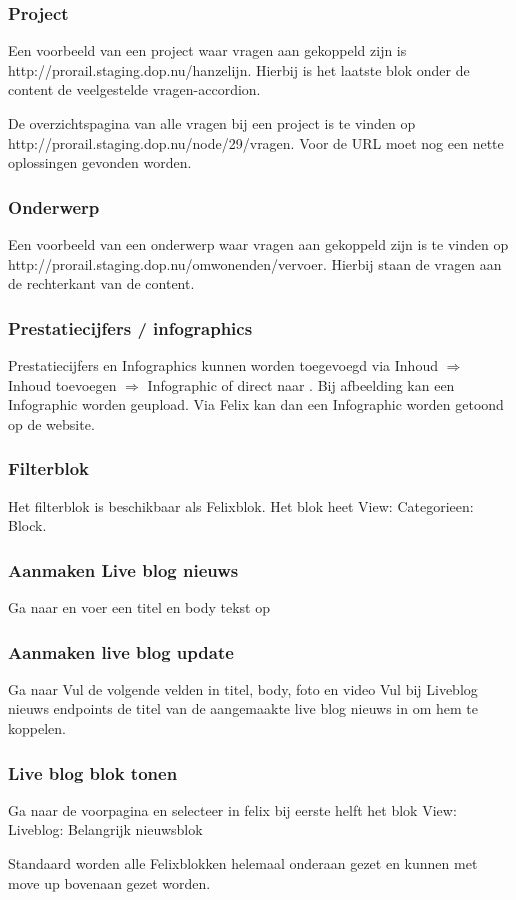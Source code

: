 \subsubsection{Project}

Een voorbeeld van een project waar vragen aan gekoppeld zijn is http://prorail.staging.dop.nu/hanzelijn. Hierbij is het laatste blok onder de content de veelgestelde vragen-accordion.

De overzichtspagina van alle vragen bij een project is te vinden op http://prorail.staging.dop.nu/node/29/vragen. Voor de URL moet nog een nette oplossingen gevonden worden.

\subsubsection{Onderwerp}

Een voorbeeld van een onderwerp waar vragen aan gekoppeld zijn is te vinden op http://prorail.staging.dop.nu/omwonenden/vervoer. Hierbij staan de vragen aan de rechterkant van de content.

\subsubsection{Prestatiecijfers / infographics}
Prestatiecijfers en Infographics kunnen worden toegevoegd via Inhoud $\Rightarrow$ Inhoud toevoegen $\Rightarrow$ Infographic of direct naar . Bij afbeelding kan een Infographic worden geupload. Via Felix kan dan een Infographic worden getoond op de website.

\subsubsection{Filterblok}
Het filterblok is beschikbaar als Felixblok. Het blok heet View: Categorieen: Block.
\subsubsection{Aanmaken Live blog nieuws}
Ga naar  en voer een titel en body tekst op

\subsubsection{Aanmaken live blog update}

Ga naar 
Vul de volgende velden in titel, body, foto en video
Vul bij Liveblog nieuws endpoints de titel van de aangemaakte live blog nieuws in om hem te koppelen.

\subsubsection{Live blog blok tonen}

Ga naar de voorpagina en selecteer in felix bij eerste helft het blok View: Liveblog: Belangrijk nieuwsblok

Standaard worden alle Felixblokken helemaal onderaan gezet en kunnen met move up bovenaan gezet worden.